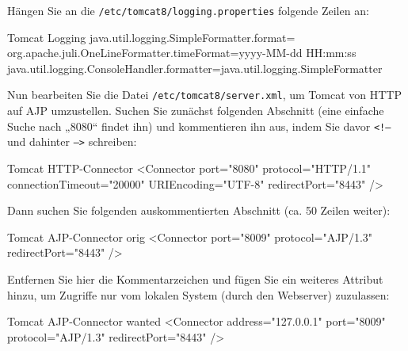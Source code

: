 \documentclass{tarentanleitung}
\begin{document}
\begin{minipage}{\linewidth}
Hängen Sie an die \texttt{/etc/tomcat8/logging.properties} folgende
Zeilen an:

\begin{lstdump}[breaklines=false]{Tomcat Logging}
java.util.logging.SimpleFormatter.format=%
org.apache.juli.OneLineFormatter.timeFormat=yyyy-MM-dd HH:mm:ss
java.util.logging.ConsoleHandler.formatter=java.util.logging.SimpleFormatter
\end{lstdump}
\end{minipage}

\begin{minipage}{\linewidth}
Nun bearbeiten Sie die Datei \texttt{/etc/tomcat8/server.xml}, um Tomcat
von HTTP auf AJP umzustellen. Suchen Sie zunächst folgenden Abschnitt
(eine einfache Suche nach „8080“ findet ihn) und kommentieren ihn aus,
indem Sie davor \texttt{<!--} und dahinter \texttt{-->} schreiben:

\begin{lstdump}[language=XML]{Tomcat HTTP-Connector}
<Connector port="8080" protocol="HTTP/1.1"
           connectionTimeout="20000"
           URIEncoding="UTF-8"
           redirectPort="8443" />
\end{lstdump}
\end{minipage}

\begin{minipage}{\linewidth}
Dann suchen Sie folgenden auskommentierten Abschnitt (ca. 50 Zeilen weiter):

\begin{lstdump}[language=XML]{Tomcat AJP-Connector orig}
<Connector port="8009" protocol="AJP/1.3" redirectPort="8443" />
\end{lstdump}

Entfernen Sie hier die Kommentarzeichen und fügen Sie ein weiteres Attribut
hinzu, um Zugriffe nur vom lokalen System (durch den Webserver) zuzulassen:

\begin{lstdump}[language=XML]{Tomcat AJP-Connector wanted}
<Connector address="127.0.0.1" port="8009" protocol="AJP/1.3" redirectPort="8443" />
\end{lstdump}
\end{minipage}
\end{document}
